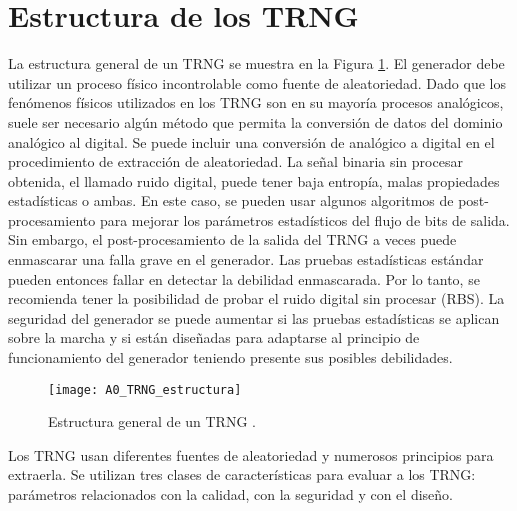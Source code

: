 	\section{Estructura de los TRNG}	
		
	La estructura general de un TRNG se muestra en la Figura \ref{fig:A1_TRNG_estructura}. El generador debe utilizar un proceso físico incontrolable como fuente de aleatoriedad. Dado que los fenómenos físicos utilizados en los TRNG son en su mayoría procesos analógicos, suele ser necesario algún método que permita la conversión de datos del dominio analógico al digital. Se puede incluir una conversión de analógico a digital en el procedimiento de extracción de aleatoriedad. La señal binaria sin procesar obtenida, el llamado ruido digital, puede tener baja entropía, malas propiedades estadísticas o ambas. En este caso, se pueden usar algunos algoritmos de post-procesamiento para mejorar los parámetros estadísticos del flujo de bits de salida. Sin embargo, el post-procesamiento de la salida del TRNG a veces puede enmascarar una falla grave en el generador. Las pruebas estadísticas estándar pueden entonces fallar en detectar la debilidad enmascarada. Por lo tanto, se recomienda tener la posibilidad de probar el ruido digital sin procesar (RBS). La seguridad del generador se puede aumentar si las pruebas estadísticas se aplican sobre la marcha y si están diseñadas para adaptarse al principio de funcionamiento del generador teniendo presente sus posibles debilidades.
			
	\begin{figure}[hbtp]
		\caption{Estructura general de un TRNG \cite{Badrignans2011}.}
		\centering
		\texttt{[image: A0\_TRNG\_estructura]}
		\label{fig:A1_TRNG_estructura}
	\end{figure}
	
	Los TRNG usan diferentes fuentes de aleatoriedad y numerosos principios para extraerla. Se utilizan tres clases de características para evaluar a los TRNG: parámetros relacionados con la calidad, con la seguridad y con el diseño.
			
